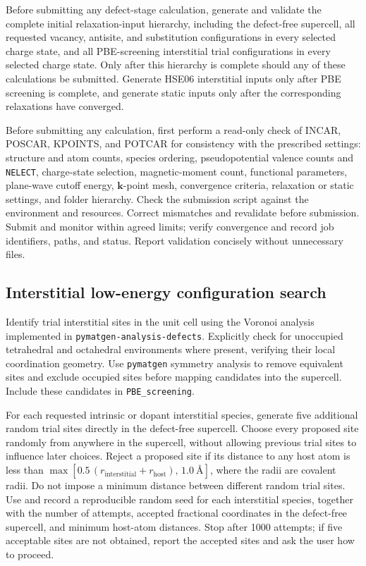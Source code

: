 \documentclass[aip,jap,reprint,amsmath,amssymb]{revtex4-2}
\begin{document}
Before submitting any defect-stage calculation, generate and validate the complete initial relaxation-input hierarchy, including the defect-free supercell, all requested vacancy, antisite, and substitution configurations in every selected charge state, and all PBE-screening interstitial trial configurations in every selected charge state. Only after this hierarchy is complete should any of these calculations be submitted. Generate HSE06 interstitial inputs only after PBE screening is complete, and generate static inputs only after the corresponding relaxations have converged.

Before submitting any calculation, first perform a read-only check of INCAR, POSCAR, KPOINTS, and POTCAR for consistency with the prescribed settings: structure and atom counts, species ordering, pseudopotential valence counts and \texttt{NELECT}, charge-state selection, magnetic-moment count, functional parameters, plane-wave cutoff energy, $\bm{k}$-point mesh, convergence criteria, relaxation or static settings, and folder hierarchy. Check the submission script against the environment and resources. Correct mismatches and revalidate before submission. Submit and monitor within agreed limits; verify convergence and record job identifiers, paths, and status. Report validation concisely without unnecessary files.

\subsection{Interstitial low-energy configuration search}

Identify trial interstitial sites in the unit cell using the Voronoi analysis implemented in \texttt{pymatgen-analysis-defects}.\cite{Shen2024} Explicitly check for unoccupied tetrahedral and octahedral environments where present, verifying their local coordination geometry. Use \texttt{pymatgen} symmetry analysis to remove equivalent sites and exclude occupied sites before mapping candidates into the supercell. Include these candidates in \texttt{PBE\_screening}.

For each requested intrinsic or dopant interstitial species, generate five additional random trial sites directly in the defect-free supercell. Choose every proposed site randomly from anywhere in the supercell, without allowing previous trial sites to influence later choices. Reject a proposed site if its distance to any host atom is less than $\max[0.5\,(r_{\mathrm{interstitial}}+r_{\mathrm{host}}),\,1.0~\text{\AA}]$, where the radii are covalent radii. Do not impose a minimum distance between different random trial sites. Use and record a reproducible random seed for each interstitial species, together with the number of attempts, accepted fractional coordinates in the defect-free supercell, and minimum host-atom distances. Stop after 1000 attempts; if five acceptable sites are not obtained, report the accepted sites and ask the user how to proceed.
\end{document}
